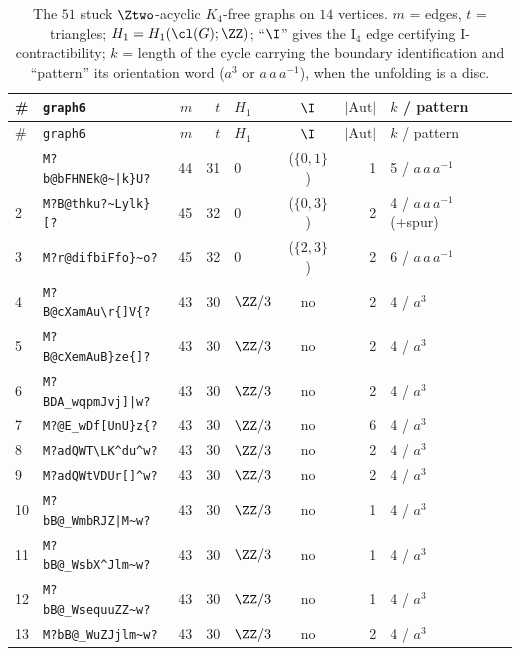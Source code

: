 \begin{longtable}{@{}llrrlcrl@{}}
\caption{The $51$ stuck $\Ztwo$-acyclic $K_4$-free graphs on $14$ vertices. $m$ = edges, $t$ = triangles; $H_1=H_1(\cl(G);\ZZ)$; ``$\I$'' gives the $\mathrm{I}_4$ edge certifying I-contractibility; $k$ = length of the cycle carrying the boundary identification and ``pattern'' its orientation word ($a^3$ or $a\,a\,a^{-1}$), when the unfolding is a disc.}\label{tab:stuck51}\\
\toprule
\# & \texttt{graph6} & $m$ & $t$ & $H_1$ & $\I$ & $|\mathrm{Aut}|$ & $k$ / pattern \\
\midrule
\endfirsthead
\toprule
\# & \texttt{graph6} & $m$ & $t$ & $H_1$ & $\I$ & $|\mathrm{Aut}|$ & $k$ / pattern \\
\midrule
\endhead
\bottomrule
\endfoot
1 & \texttt{M?b@bFHNEk@\textasciitilde{}|k\}U?} & 44 & 31 & $0$ & ($\{0,1\}$) & 1 & 5 / $a\,a\,a^{-1}$ \\
2 & \texttt{M?B@thku?\textasciitilde{}Lylk\}[?} & 45 & 32 & $0$ & ($\{0,3\}$) & 2 & 4 / $a\,a\,a^{-1}$ (+spur) \\
3 & \texttt{M?r@d\textasciigrave{}ifbiFfo\}\textasciitilde{}o?} & 45 & 32 & $0$ & ($\{2,3\}$) & 2 & 6 / $a\,a\,a^{-1}$ \\
4 & \texttt{M?B@cXamAu\textbackslash{}r\{]V\{?} & 43 & 30 & $\ZZ/3$ & no & 2 & 4 / $a^{3}$ \\
5 & \texttt{M?B@cXemAuB\}ze\{]?} & 43 & 30 & $\ZZ/3$ & no & 2 & 4 / $a^{3}$ \\
6 & \texttt{M?BDA\_wqpmJvj]|w?} & 43 & 30 & $\ZZ/3$ & no & 2 & 4 / $a^{3}$ \\
7 & \texttt{M?\textasciigrave{}@E\_wDf[UnU\}z\{?} & 43 & 30 & $\ZZ/3$ & no & 6 & 4 / $a^{3}$ \\
8 & \texttt{M?\textasciigrave{}adQWT\textbackslash{}LK\textasciicircum{}du\textasciicircum{}w?} & 43 & 30 & $\ZZ/3$ & no & 2 & 4 / $a^{3}$ \\
9 & \texttt{M?\textasciigrave{}adQWtVDUr[]\textasciicircum{}w?} & 43 & 30 & $\ZZ/3$ & no & 2 & 4 / $a^{3}$ \\
10 & \texttt{M?bB@\_WmbRJZ|M\textasciitilde{}w?} & 43 & 30 & $\ZZ/3$ & no & 1 & 4 / $a^{3}$ \\
11 & \texttt{M?bB@\_WsbX\textasciicircum{}Jlm\textasciitilde{}w?} & 43 & 30 & $\ZZ/3$ & no & 1 & 4 / $a^{3}$ \\
12 & \texttt{M?bB@\_WsequuZZ\textasciitilde{}w?} & 43 & 30 & $\ZZ/3$ & no & 1 & 4 / $a^{3}$ \\
13 & \texttt{M?bB@\_Wu\textasciigrave{}ZJjlm\textasciitilde{}w?} & 43 & 30 & $\ZZ/3$ & no & 2 & 4 / $a^{3}$ \\

\end{longtable}
